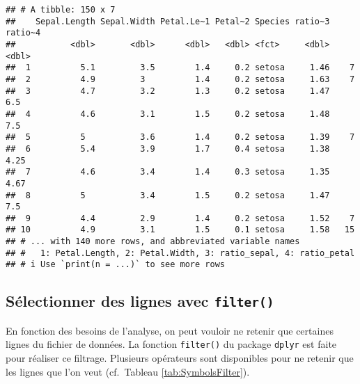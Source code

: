 \documentclass[
  french,
]{book}
\begin{document}
\begin{verbatim}
## # A tibble: 150 x 7
##    Sepal.Length Sepal.Width Petal.Le~1 Petal~2 Species ratio~3 ratio~4
##           <dbl>       <dbl>      <dbl>   <dbl> <fct>     <dbl>   <dbl>
##  1          5.1         3.5        1.4     0.2 setosa     1.46    7   
##  2          4.9         3          1.4     0.2 setosa     1.63    7   
##  3          4.7         3.2        1.3     0.2 setosa     1.47    6.5 
##  4          4.6         3.1        1.5     0.2 setosa     1.48    7.5 
##  5          5           3.6        1.4     0.2 setosa     1.39    7   
##  6          5.4         3.9        1.7     0.4 setosa     1.38    4.25
##  7          4.6         3.4        1.4     0.3 setosa     1.35    4.67
##  8          5           3.4        1.5     0.2 setosa     1.47    7.5 
##  9          4.4         2.9        1.4     0.2 setosa     1.52    7   
## 10          4.9         3.1        1.5     0.1 setosa     1.58   15   
## # ... with 140 more rows, and abbreviated variable names
## #   1: Petal.Length, 2: Petal.Width, 3: ratio_sepal, 4: ratio_petal
## # i Use `print(n = ...)` to see more rows
\end{verbatim}

\hypertarget{suxe9lectionner-des-lignes-avec-filter}{%
\subsection{\texorpdfstring{Sélectionner des lignes avec \texttt{filter()}}{Sélectionner des lignes avec filter()}}\label{suxe9lectionner-des-lignes-avec-filter}}

En fonction des besoins de l'analyse, on peut vouloir ne retenir que certaines lignes du fichier de données. La fonction \texttt{filter()} du package \texttt{dplyr} est faite pour réaliser ce filtrage. Plusieurs opérateurs sont disponibles pour ne retenir que les lignes que l'on veut (cf.~Tableau \ref{tab:SymbolsFilter}).

\providecommand{\docline}[3]{\noalign{\global\setlength{\arrayrulewidth}{#1}}\arrayrulecolor[HTML]{#2}\cline{#3}}

\setlength{\tabcolsep}{2pt}

\renewcommand*{\arraystretch}{1.5}
\end{document}
